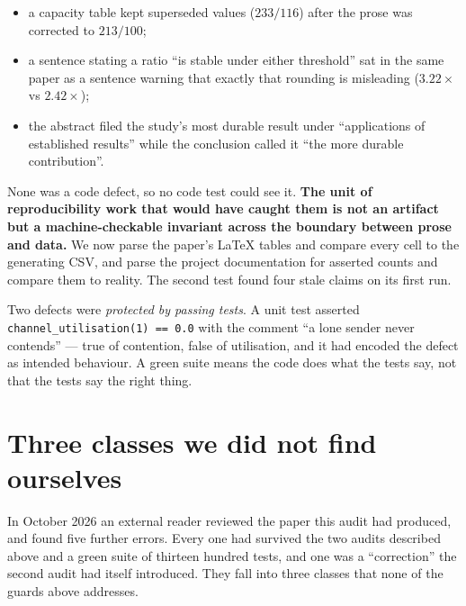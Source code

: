 \documentclass[conference]{IEEEtran}
\begin{document}
\begin{itemize}
\item a capacity table kept superseded values ($233/116$) after the prose was corrected to
$213/100$;
\item a sentence stating a ratio ``is stable under either threshold'' sat in the same paper as a
sentence warning that exactly that rounding is misleading ($3.22\times$ vs $2.42\times$);
\item the abstract filed the study's most durable result under ``applications of established
results'' while the conclusion called it ``the more durable contribution''.
\end{itemize}

None was a code defect, so no code test could see it. \textbf{The unit of reproducibility work that
would have caught them is not an artifact but a machine-checkable invariant across the boundary
between prose and data.} We now parse the paper's \LaTeX{} tables and compare every cell to the
generating CSV, and parse the project documentation for asserted counts and compare them to reality.
The second test found four stale claims on its first run.

Two defects were \emph{protected by passing tests}. A unit test asserted
\texttt{channel\_utilisation(1) == 0.0} with the comment ``a lone sender never contends'' --- true of
contention, false of utilisation, and it had encoded the defect as intended behaviour. A green suite
means the code does what the tests say, not that the tests say the right thing.

\section{Three classes we did not find ourselves}\label{sec:external}
In October 2026 an external reader reviewed the paper this audit had produced, and found five
further errors. Every one had survived the two audits described above and a green suite of
thirteen hundred tests, and one was a ``correction'' the second audit had itself introduced. They
fall into three classes that none of the guards above addresses.
\end{document}
